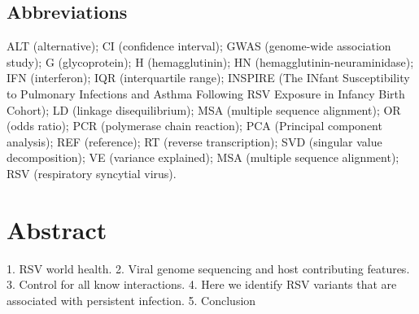 \documentclass{article}
\begin{document}
\linenumbers
\subsection*{Abbreviations}
ALT (alternative);
CI (confidence interval);
GWAS (genome-wide association study);
G (glycoprotein);
H (hemagglutinin);
HN (hemagglutinin-neuraminidase);
IFN (interferon);
IQR (interquartile range);
INSPIRE (The INfant Susceptibility to Pulmonary Infections and Asthma Following RSV Exposure in Infancy Birth Cohort);
LD (linkage disequilibrium);
MSA (multiple sequence alignment);
OR (odds ratio);
PCR (polymerase chain reaction);
PCA (Principal component analysis);
REF (reference);
RT (reverse transcription);
SVD (singular value decomposition);
VE (variance explained);
MSA (multiple sequence alignment);
RSV (respiratory syncytial virus).

\section{Abstract}
1. RSV world health.
2. Viral genome sequencing and host contributing features.
3. Control for all know interactions.
4. Here we identify RSV variants that are associated with persistent infection.
5. Conclusion
\end{document}
